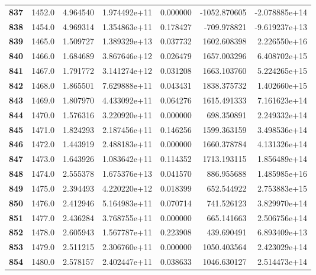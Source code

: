 \documentclass{report}[12pt]
\begin{document}
\begin{center}
\begin{tabular}{lrrrrrr}
\textbf{837 } &         1452.0 &   4.964540 &  1.974492e+11 &    0.000000 & -1052.870605 & -2.078885e+14 \\
\textbf{838 } &         1454.0 &   4.969314 &  1.354863e+11 &    0.178427 &  -709.978821 & -9.619237e+13 \\
\textbf{839 } &         1465.0 &   1.509727 &  1.389329e+13 &    0.037732 &  1602.608398 &  2.226550e+16 \\
\textbf{840 } &         1466.0 &   1.684689 &  3.867646e+12 &    0.026479 &  1657.003296 &  6.408702e+15 \\
\textbf{841 } &         1467.0 &   1.791772 &  3.141274e+12 &    0.031208 &  1663.103760 &  5.224265e+15 \\
\textbf{842 } &         1468.0 &   1.865501 &  7.629888e+11 &    0.043431 &  1838.375732 &  1.402660e+15 \\
\textbf{843 } &         1469.0 &   1.807970 &  4.433092e+11 &    0.064276 &  1615.491333 &  7.161623e+14 \\
\textbf{844 } &         1470.0 &   1.576316 &  3.220920e+11 &    0.000000 &   698.350891 &  2.249332e+14 \\
\textbf{845 } &         1471.0 &   1.824293 &  2.187456e+11 &    0.146256 &  1599.363159 &  3.498536e+14 \\
\textbf{846 } &         1472.0 &   1.443919 &  2.488183e+11 &    0.000000 &  1660.378784 &  4.131326e+14 \\
\textbf{847 } &         1473.0 &   1.643926 &  1.083642e+11 &    0.114352 &  1713.193115 &  1.856489e+14 \\
\textbf{848 } &         1474.0 &   2.555378 &  1.675376e+13 &    0.041570 &   886.955688 &  1.485985e+16 \\
\textbf{849 } &         1475.0 &   2.394493 &  4.220220e+12 &    0.018399 &   652.544922 &  2.753883e+15 \\
\textbf{850 } &         1476.0 &   2.412946 &  5.164983e+11 &    0.070714 &   741.526123 &  3.829970e+14 \\
\textbf{851 } &         1477.0 &   2.436284 &  3.768755e+11 &    0.000000 &   665.141663 &  2.506756e+14 \\
\textbf{852 } &         1478.0 &   2.605943 &  1.567787e+11 &    0.223908 &   439.690491 &  6.893409e+13 \\
\textbf{853 } &         1479.0 &   2.511215 &  2.306760e+11 &    0.000000 &  1050.403564 &  2.423029e+14 \\
\textbf{854 } &         1480.0 &   2.578157 &  2.402447e+11 &    0.038633 &  1046.630127 &  2.514473e+14 \\

\end{tabular}
\end{center}
\end{document}
